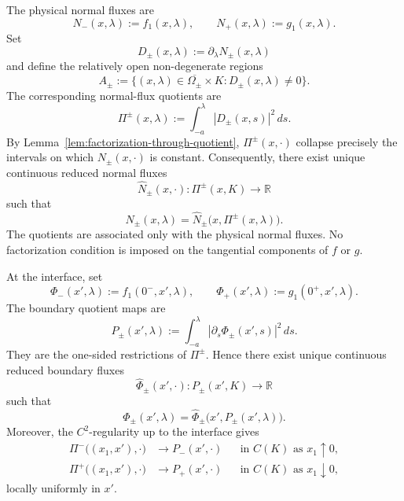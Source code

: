 \documentclass[11pt]{amsart}
\numberwithin{equation}{section}
\theoremstyle{plain}
\theoremstyle{definition}
\theoremstyle{remark}
\begin{document}
The physical normal fluxes are
\begin{equation}
\label{eq:flat-normal-fluxes}
    N_-(x,\lambda):=f_1(x,\lambda),
    \qquad
    N_+(x,\lambda):=g_1(x,\lambda).
\end{equation}
Set
\[
    D_\pm(x,\lambda):=\partial_\lambda N_\pm(x,\lambda)
\]
and define the relatively open non-degenerate regions
\begin{equation}
\label{eq:flat-nondegenerate-regions}
    A_\pm
    :=
    \bigl\{
        (x,\lambda)\in\overline{\Omega_\pm}\times K:
        D_\pm(x,\lambda)\neq0
    \bigr\}.
\end{equation}
The corresponding normal-flux quotients are
\begin{equation}
\label{eq:flat-quotients}
    \Pi^\pm(x,\lambda)
    :=
    \int_{-a}^{\lambda}|D_\pm(x,s)|^2\,ds.
\end{equation}
By Lemma~\ref{lem:factorization-through-quotient}, \(\Pi^\pm(x,\cdot)\)
collapse precisely the intervals on which \(N_\pm(x,\cdot)\) is constant.
Consequently, there exist unique continuous reduced normal fluxes
\[
    \widehat N_\pm(x,\cdot):
    \Pi^\pm(x,K)\longrightarrow\mathbb R
\]
such that
\begin{equation}
\label{eq:flat-reduced-interior-normal-fluxes}
    N_\pm(x,\lambda)
    =
    \widehat N_\pm
    \bigl(x,\Pi^\pm(x,\lambda)\bigr).
\end{equation}
The quotients are associated only with the physical normal fluxes. No
factorization condition is imposed on the tangential components of \(f\) or
\(g\).

At the interface, set
\begin{equation}
\label{eq:flat-boundary-normal-fluxes}
    \Phi_-(x',\lambda):=f_1(0^-,x',\lambda),
    \qquad
    \Phi_+(x',\lambda):=g_1(0^+,x',\lambda).
\end{equation}
The boundary quotient maps are
\begin{equation}
\label{eq:flat-boundary-quotients}
    P_\pm(x',\lambda)
    :=
    \int_{-a}^{\lambda}
        |\partial_s\Phi_\pm(x',s)|^2\,ds.
\end{equation}
They are the one-sided restrictions of \(\Pi^\pm\). Hence there exist unique
continuous reduced boundary fluxes
\[
    \widehat\Phi_\pm(x',\cdot):
    P_\pm(x',K)\longrightarrow\mathbb R
\]
such that
\begin{equation}
\label{eq:flat-reduced-boundary-fluxes}
    \Phi_\pm(x',\lambda)
    =
    \widehat\Phi_\pm
    \bigl(x',P_\pm(x',\lambda)\bigr).
\end{equation}
Moreover, the \(C^2\)-regularity up to the interface gives
\begin{equation}
\label{eq:flat-quotient-boundary-convergence}
\begin{aligned}
    \Pi^-\bigl((x_1,x'),\cdot\bigr)
    &\longrightarrow
    P_-(x',\cdot)
    &&\text{in }C(K)\text{ as }x_1\uparrow0,
\\
    \Pi^+\bigl((x_1,x'),\cdot\bigr)
    &\longrightarrow
    P_+(x',\cdot)
    &&\text{in }C(K)\text{ as }x_1\downarrow0,
\end{aligned}
\end{equation}
locally uniformly in \(x'\).
\end{document}
